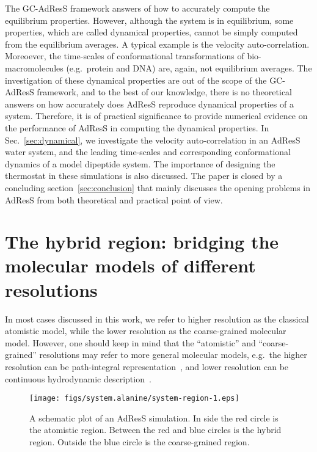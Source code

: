 \documentclass[epjST]{svjour}
\begin{document}
The GC-AdResS framework answers of how to accurately compute the  equilibrium properties.
However, although the system is in equilibrium,
some properties, which are called dynamical properties, cannot be simply computed from the equilibrium averages.
A typical example is the velocity auto-correlation.
Moreoever, the time-scales of conformational transformations
of bio-macromolecules (e.g.~protein and DNA)
are, again, not equilibrium averages.
The investigation of these  dynamical properties are out of the scope of the GC-AdResS framework,
and to the best of our knowledge, there is no theoretical answers on how accurately does AdResS reproduce
dynamical properties of a system.
Therefore, it is of practical significance to  provide numerical
evidence on the performance of AdResS in computing the dynamical properties.
In Sec.~\ref{sec:dynamical}, we investigate the
velocity auto-correlation in an AdResS water system, and the
leading time-scales and corresponding conformational dynamics of
a model dipeptide system.
The importance of designing the thermostat in these simulations
is also discussed.
The paper is closed by a concluding section~\ref{sec:conclusion}
that mainly discusses the opening problems in AdResS from both theoretical
and practical point of view.

\section{The hybrid region: bridging the molecular models of different resolutions}
\label{sec:design}

In most cases discussed in this work, we refer to higher resolution as the classical atomistic model, while
the lower resolution as the coarse-grained molecular model. However,
one should keep in mind that the ``atomistic'' and ``coarse-grained'' resolutions
may refer to more general molecular models, e.g.~the higher resolution can be
path-integral representation~\cite{poma2010classical}, and lower resolution can be continuous
hydrodynamic description~\cite{delgado2009coupling}.

\begin{figure}
  \centering
  \texttt{[image: figs/system.alanine/system-region-1.eps]}
  \caption{A schematic plot of an AdResS simulation. In side the red circle is the atomistic region. Between the red and blue circles is the hybrid region. Outside the blue circle is the coarse-grained region.}
  \label{fig:sys-region}
\end{figure}
\end{document}
